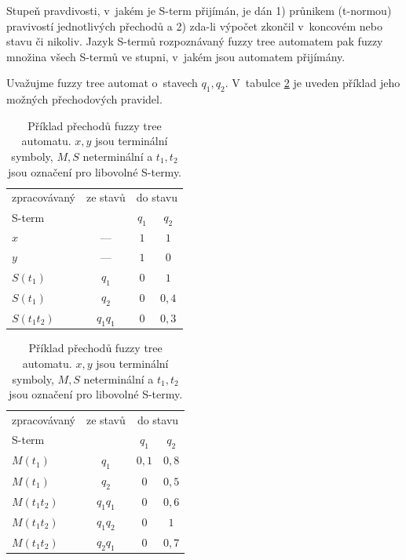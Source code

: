 
Stupeň pravdivosti, v~jakém je S-term přijímán, je dán 1) průnikem (t-normou) pravivostí jednotlivých přechodů a 2) zda-li výpočet zkončil v~koncovém nebo stavu či nikoliv. Jazyk S-termů rozpoznávaný fuzzy tree automatem pak fuzzy množina všech S-termů ve stupni, v~jakém jsou automatem přijímány.

\begin{example}
  Uvažujme fuzzy tree automat o~stavech $q_1, q_2$. V~tabulce \ref{tab:FuzTreAutTrans} je uveden příklad jeho možných přechodových pravidel.
\end{example}

\begin{table}
  \begin{tabular}{|l|c||c|c|}
    \hline 
    zpracovávaný	& ze stavů	& \multicolumn{2}{|c|}{do stavu}	\\
    S-term		& 		& $q_1$		& $q_2$		\\
    \hline \hline
    $x$			& ---		& $1$		& $1$		\\
    \hline \hline
    $y$			& ---		& $1$		& $0$		\\
    \hline \hline
    $S(t_1)$		& $q_1$		& $0$		& $1$		\\
    $S(t_1)$		& $q_2$		& $0$		& $0{,}4$	\\
    $S(t_1 t_2)$	& $q_1 q_1$	& $0$		& $0{,}3$	\\  
    \hline
  \end{tabular} \hfill
  \begin{tabular}{|l|c||c|c|}
    \hline 
    zpracovávaný	& ze stavů	& \multicolumn{2}{|c|}{do stavu}	\\
    S-term		& 		& $q_1$		& $q_2$		\\
    \hline \hline
    $M(t_1)$		& $q_1$		& $0{,}1$	& $0{,}8$	\\
    $M(t_1)$		& $q_2$		& $0$		& $0{,}5$	\\
    $M(t_1 t_2)$	& $q_1 q_1$	& $0$		& $0{,}6$	\\
    $M(t_1 t_2)$	& $q_1 q_2$	& $0$		& $1$		\\
    $M(t_1 t_2)$	& $q_2 q_1$	& $0$		& $0{,}7$	\\ 
    \hline
  \end{tabular}
  
  \caption[Příklad přechodů fuzzy tree automatu]{Příklad přechodů fuzzy tree automatu. $x, y$ jsou terminální symboly, $M, S$ neterminální a $t_1, t_2$ jsou označení pro libovolné S-termy.} \label{tab:FuzTreAutTrans}
\end{table}

